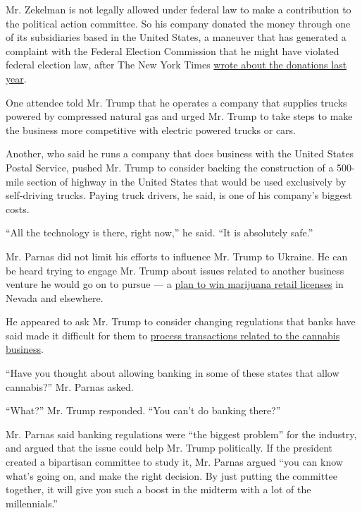 Mr. Zekelman is not legally allowed under federal law to make a
contribution to the political action committee. So his company donated
the money through one of its subsidiaries based in the United States, a
maneuver that has generated a complaint with the Federal Election
Commission that he might have violated federal election law, after The
New York Times
\href{https://www.nytimes.com/2019/05/20/us/politics/hes-one-of-the-biggest-backers-of-trumps-push-to-protect-american-steel-and-hes-canadian.html}{wrote
about the donations last year}.

One attendee told Mr. Trump that he operates a company that supplies
trucks powered by compressed natural gas and urged Mr. Trump to take
steps to make the business more competitive with electric powered trucks
or cars.

Another, who said he runs a company that does business with the United
States Postal Service, pushed Mr. Trump to consider backing the
construction of a 500-mile section of highway in the United States that
would be used exclusively by self-driving trucks. Paying truck drivers,
he said, is one of his company's biggest costs.

``All the technology is there, right now,'' he said. ``It is absolutely
safe.''

Mr. Parnas did not limit his efforts to influence Mr. Trump to Ukraine.
He can be heard trying to engage Mr. Trump about issues related to
another business venture he would go on to pursue --- a
\href{https://www.nytimes.com/2019/10/23/us/kukushkin-giuliani-russia-cannabis-marijuana.html}{plan
to win marijuana retail licenses} in Nevada and elsewhere.

He appeared to ask Mr. Trump to consider changing regulations that banks
have said made it difficult for them to
\href{https://www.nytimes.com/2014/02/15/us/us-issues-marijuana-guidelines-for-banks.html}{process
transactions related to the cannabis business}.

``Have you thought about allowing banking in some of these states that
allow cannabis?'' Mr. Parnas asked.

``What?'' Mr. Trump responded. ``You can't do banking there?''

Mr. Parnas said banking regulations were ``the biggest problem'' for the
industry, and argued that the issue could help Mr. Trump politically. If
the president created a bipartisan committee to study it, Mr. Parnas
argued ``you can know what's going on, and make the right decision. By
just putting the committee together, it will give you such a boost in
the midterm with a lot of the millennials.''

